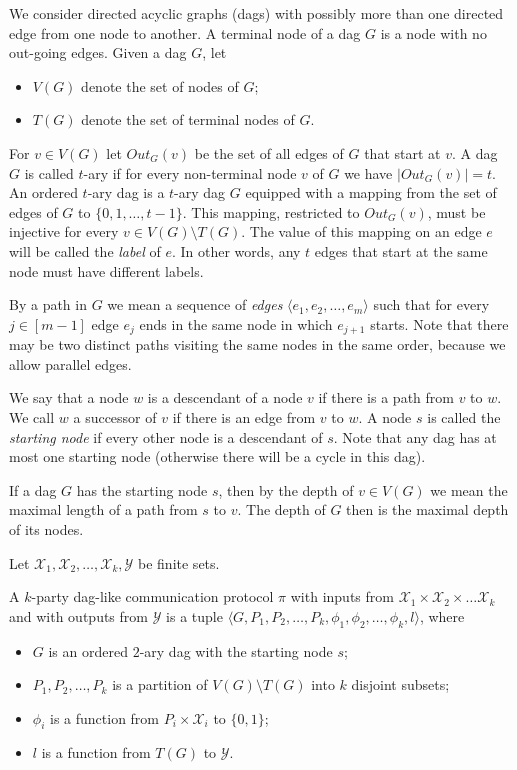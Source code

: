 We consider directed acyclic graphs (dags) with possibly more than one directed edge from one node to another.
%
%
%
%
A terminal node of a dag $G$ is a node with no out-going edges.
Given a dag $G$, let
\begin{itemize}
\item $V(G)$ denote the set of nodes of $G$;
\item $T(G)$ denote the  set of terminal nodes of $G$. 
\end{itemize}
For $v\in V(G)$ let $Out_G(v)$ be the set of all edges of $G$ that start at $v$.
A dag $G$ is called $t$-ary if for every non-terminal node $v$ of $G$ we have $|Out_G(v)| = t$. An ordered $t$-ary dag is a $t$-ary dag $G$ equipped with a mapping from the set of edges of $G$ to $\{0, 1, \ldots, t - 1\}$. This mapping, restricted to $Out_G(v)$, must be injective for every $v\in V(G)\setminus T(G)$. The value of this mapping on an edge $e$ will be called the \emph{label} of $e$. In other words, any $t$ edges that start at the same node must have different labels.


By a path in $G$ we mean a sequence of \emph{edges} $\langle e_1, e_2, \ldots, e_m\rangle$ such that for every $j\in[m - 1]$ edge $e_j$ ends in the same node in which $e_{j + 1}$ starts.  Note that there may be two distinct paths visiting the same nodes in the same order, because we allow parallel edges.

We say that a node $w$ is a descendant of a node $v$ if there is a path from $v$ to $w$. We call $w$ a successor of $v$ if there is an edge from $v$ to $w$. A node $s$ is called the \emph{starting node} if every other node is a descendant of $s$. Note that any dag has at most one starting node (otherwise there will be a cycle in this dag).

If a dag $G$ has the starting node $s$, then by the depth of $v\in V(G)$ we mean the maximal length of a path from $s$ to $v$. The depth of $G$ then is the maximal depth of its nodes. 

%
%
%
%
Let $\mathcal{X}_1, \mathcal{X}_2, \ldots, \mathcal{X}_k, \mathcal{Y}$
be finite sets.  %

\begin{definition}
\label{dag_like_protocol}
A $k$-party dag-like communication protocol $\pi$ with inputs from $\mathcal{X}_1 \times \mathcal{X}_2 \times \ldots \mathcal{X}_k$ and with outputs from $\mathcal{Y}$ is a tuple $\langle G, P_1, P_2, \ldots, P_k, \phi_1, \phi_2, \ldots, \phi_k, l\rangle$, where
\begin{itemize}
\item $G$ is an ordered $2$-ary dag with the starting node $s$;
\item $P_1, P_2, \ldots, P_k$ is a partition of $V(G)\setminus T(G)$ into $k$ disjoint subsets;
\item $\phi_i$ is a function from $P_i\times \mathcal{X}_i$ to $\{0, 1\}$;
\item $l$ is a function from $T(G)$ to $\mathcal{Y}$.
\end{itemize}
\end{definition}




